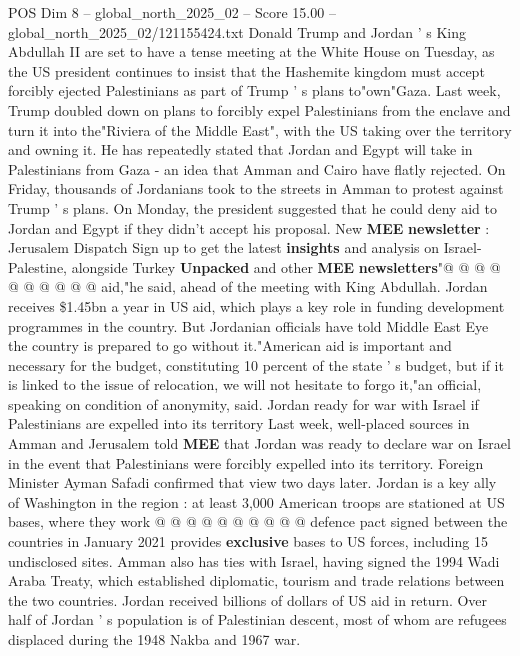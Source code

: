 \begin{textsample}{POS Dim 8 – global\_north\_2025\_02 – Score 15.00 – global\_north\_2025\_02/121155424.txt}  \label{ex:f8_pos_005}
Donald Trump and Jordan ' s King Abdullah II are set to have a tense meeting at the White House on Tuesday, as the US president continues to insist that the Hashemite kingdom must accept forcibly ejected Palestinians as part of Trump ' s plans to"own"Gaza.
Last week, Trump doubled down on plans to forcibly expel Palestinians from the enclave and turn it into the"Riviera of the Middle East", with the US taking over the territory and owning it.
He has repeatedly stated that Jordan and Egypt will take in Palestinians from Gaza - an idea that Amman and Cairo have flatly rejected.
On Friday, thousands of Jordanians took to the streets in Amman to protest against Trump ' s plans.
On Monday, the president suggested that he could deny aid to Jordan and Egypt if they didn't accept his proposal.
New \textbf{MEE} \textbf{newsletter} : Jerusalem Dispatch Sign up to get the latest \textbf{insights} and analysis on Israel-Palestine, alongside Turkey \textbf{Unpacked} and other \textbf{MEE} \textbf{newsletters}"@ @ @ @ @ @ @ @ @ @ aid,"he said, ahead of the meeting with King Abdullah.
Jordan receives \$1.45bn a year in US aid, which plays a key role in funding development programmes in the country.
But Jordanian officials have told Middle East Eye the country is prepared to go without it."American aid is important and necessary for the budget, constituting 10 percent of the state ' s budget, but if it is linked to the issue of relocation, we will not hesitate to forgo it,"an official, speaking on condition of anonymity, said.
Jordan ready for war with Israel if Palestinians are expelled into its territory Last week, well-placed sources in Amman and Jerusalem told \textbf{MEE} that Jordan was ready to declare war on Israel in the event that Palestinians were forcibly expelled into its territory.
Foreign Minister Ayman Safadi confirmed that view two days later.
Jordan is a key ally of Washington in the region : at least 3,000 American troops are stationed at US bases, where they work @ @ @ @ @ @ @ @ @ @ defence pact signed between the countries in January 2021 provides \textbf{exclusive} bases to US forces, including 15 undisclosed sites.
Amman also has ties with Israel, having signed the 1994 Wadi Araba Treaty, which established diplomatic, tourism and trade relations between the two countries.
Jordan received billions of dollars of US aid in return.
Over half of Jordan ' s population is of Palestinian descent, most of whom are refugees displaced during the 1948 Nakba and 1967 war.

\end{textsample}
